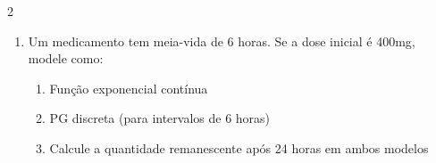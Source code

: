\documentclass[11pt]{article}
\begin{document}
\begin{multicols}{2}
\begin{enumerate}
\item Um medicamento tem meia-vida de 6 horas. Se a dose inicial é 400mg, modele como:
\begin{enumerate}[label=\alph*)]
\item Função exponencial contínua
\item PG discreta (para intervalos de 6 horas)
\item Calcule a quantidade remanescente após 24 horas em ambos modelos
\end{enumerate}

\end{enumerate}

\end{multicols}
\end{document}
